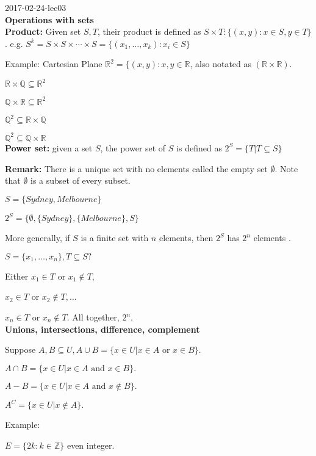 \documentclass[a4paper, 11pt, twoside]{article}
\begin{document}
2017-02-24-lec03
\\

\textbf{Operations with sets} \\

\textbf{Product:} Given set $S, T$, their product is defined as $S\times T:\{(x,y): x \in S, y \in T\}$. e.g. $S^k = S\times S \times \cdots \times S = \{(x_1, \dots, x_k): x_i \in S\}$

Example: Cartesian Plane $\mathbb{R}^2 = \{(x,y): x, y \in \mathbb{R}$, also notated as $(\mathbb{R} \times \mathbb{R})$.

$\mathbb{R}\times \mathbb{Q} \subseteq \mathbb{R}^2$

$\mathbb{Q}\times \mathbb{R} \subseteq \mathbb{R}^2$

$\mathbb{Q}^2 \subseteq \mathbb{R}\times \mathbb{Q}$

$\mathbb{Q}^2 \subseteq \mathbb{Q}\times \mathbb{R}$\\

\textbf{Power set:} given a set $S$, the power set of $S$ is defined as $2^{S} = \{T | T \subseteq S\}$

\textbf{Remark:} There is a unique set with no elements called the empty set $\emptyset$. Note that $\emptyset$ is a subset of every subset.

$S=\{Sydney, Melbourne\}$

$2^S = \{\emptyset, \{Sydney\}, \{Melbourne\}, S\}$

More generally, if $S$ is a finite set with $n$ elements, then $2^S$ has $2^n$ elements .

$S = \{x_1, \dots , x_n\}, T\subseteq S?$

Either $x_1 \in T$ or $x_1 \not \in T$,

$x_2 \in T$ or $x_2 \not \in T, \dots$

$x_n \in T$ or $x_n \not \in T.$ All together, $2^n$.\\

\textbf{Unions, intersections, difference, complement}

Suppose $A, B \subseteq U, A\cup B= \{x \in U | x \in A \text{ or } x \in B\}.$

$A\cap B = \{x\in U | x\in A \text{ and } x \in B\}.$ 

$A-B = \{x\in U|x\in A \text{ and } x \not \in B\}.$

$A^C = \{x \in U |x \not \in A\}.$

Example: 

$E=\{2k: k\in \mathbb{Z}\}$ even integer.
\end{document}
